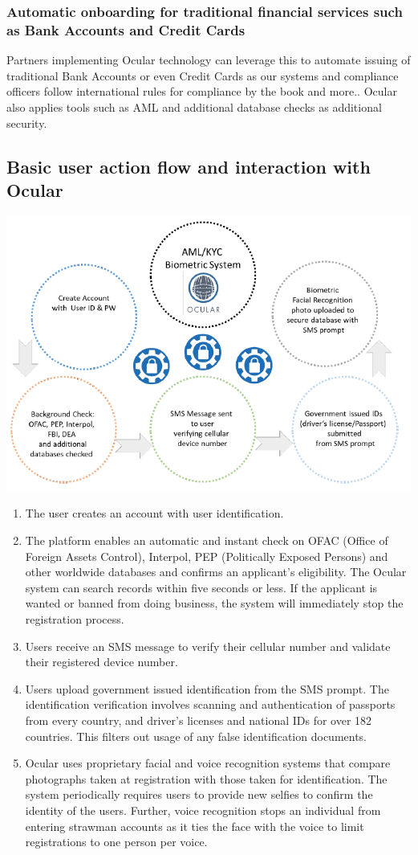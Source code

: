 \documentclass[12pt]{article}
\begin{document}
\subsubsection*{Automatic onboarding for traditional financial services such as Bank Accounts and Credit Cards}
Partners implementing Ocular technology can leverage this to automate issuing of traditional Bank Accounts or even Credit Cards as our systems and compliance officers follow international rules for compliance by the book and more.. Ocular also applies tools such as AML and additional database checks as additional security.


\clearpage
\subsection{Basic user action flow and interaction with Ocular}
\centerline{\includegraphics[width=1.1\textwidth]{biometric}}
\begin{enumerate}
\item The user creates an account with user identification.
\item The platform enables an automatic and instant check on OFAC (Office of Foreign Assets Control), Interpol, PEP (Politically Exposed Persons) and other worldwide databases and confirms an applicant’s eligibility. The Ocular system can search records within five seconds or less. If the applicant is wanted or banned from doing business, the system will immediately stop the registration process.
\item Users receive an SMS message to verify their cellular number and validate their registered device number.
\item Users upload government issued identification from the SMS prompt. The identification verification involves scanning and authentication of passports from every country, and driver's licenses and national IDs for over 182 countries. This filters out usage of any false identification documents.
\item Ocular uses proprietary facial and voice recognition systems that compare photographs taken at registration with those taken for identification. The system periodically requires users to provide new selfies to confirm the identity of the users. Further, voice recognition stops an individual from entering strawman accounts as it ties the face with the voice to limit registrations to one person per voice.
\end{enumerate}
\end{document}
